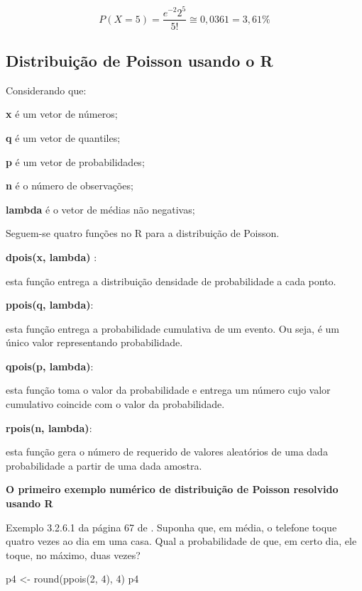 \documentclass[
]{book}
\newenvironment{Shaded}{\begin{snugshade}}{\end{snugshade}}
\newcommand{\DecValTok}[1]{\textcolor[rgb]{0.00,0.00,0.81}{#1}}
\newcommand{\FunctionTok}[1]{\textcolor[rgb]{0.00,0.00,0.00}{#1}}
\newcommand{\NormalTok}[1]{#1}
\newcommand{\OtherTok}[1]{\textcolor[rgb]{0.56,0.35,0.01}{#1}}
\begin{document}
\begin{equation*}
  P(X=5) = \frac{e^{-2}2^{5}}{5!} \cong 0,0361 = 3,61\%
\end{equation*}

\hypertarget{distribuiuxe7uxe3o-de-poisson-usando-o-r}{%
\subsection{Distribuição de Poisson usando o R}\label{distribuiuxe7uxe3o-de-poisson-usando-o-r}}

Considerando que:

\textbf{x} é um vetor de números;

\textbf{q} é um vetor de quantiles;

\textbf{p} é um vetor de probabilidades;

\textbf{n} é o número de observações;

\textbf{lambda} é o vetor de médias não negativas;

Seguem-se quatro funções no R para a distribuição de Poisson.

\textbf{dpois(x, lambda)} :

esta função entrega a distribuição densidade de probabilidade a cada ponto.

\textbf{ppois(q, lambda)}:

esta função entrega a probabilidade cumulativa de um evento. Ou seja, é um único valor representando probabilidade.

\textbf{qpois(p, lambda)}:

esta função toma o valor da probabilidade e entrega um número cujo valor cumulativo coincide com o valor da probabilidade.

\textbf{rpois(n, lambda)}:

esta função gera o número de requerido de valores aleatórios de uma dada probabilidade a partir de uma dada amostra.

\textbf{O primeiro exemplo numérico de distribuição de Poisson resolvido usando R}

Exemplo 3.2.6.1 da página 67 de \citet{Sartoris2013}. Suponha que, em média, o telefone toque quatro vezes ao dia em uma casa. Qual a probabilidade de que, em certo dia, ele toque, no máximo, duas vezes?

\begin{Shaded}
\begin{Highlighting}[]
\NormalTok{p4 }\OtherTok{\textless{}{-}} \FunctionTok{round}\NormalTok{(}\FunctionTok{ppois}\NormalTok{(}\DecValTok{2}\NormalTok{, }\DecValTok{4}\NormalTok{), }\DecValTok{4}\NormalTok{)}
\NormalTok{p4}
\end{Highlighting}
\end{Shaded}
\end{document}
